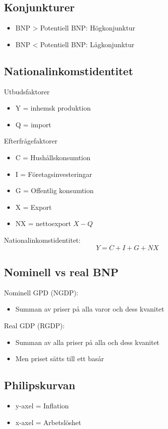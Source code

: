 \documentclass[12pt,a4paper]{article}
\begin{document}
\subsection*{Konjunkturer}
\begin{itemize}
    \item BNP > Potentiell BNP: Högkonjunktur
    \item BNP < Potentiell BNP: Lågkonjunktur
\end{itemize}

\subsection*{Nationalinkomstidentitet}
Utbudsfaktorer
\begin{itemize}
    \item Y = inhemsk produktion
    \item Q = import
\end{itemize}

\noindent Efterfrågefaktorer
\begin{itemize}
    \item C = Hushållskonsumtion
    \item I = Företagsinvesteringar
    \item G = Offentlig konsumtion
    \item X = Export
    \item NX = nettoexport $X-Q$
\end{itemize}

Nationalinkomstidentitet:
{\large $$Y = C + I + G + NX$$}

\subsection*{Nominell vs real BNP}
Nominell GPD (NGDP):
\begin{itemize}
    \item Summan av priser på alla varor och dess kvanitet
\end{itemize}

\noindent Real GDP (RGDP):
\begin{itemize}
    \item Summan av alla priser på alla och dess kvanitet
    \item Men priset sätts till ett basår
\end{itemize}

\subsection*{Philipskurvan}
\begin{itemize}
    \item y-axel = Inflation
    \item x-axel = Arbetslöshet
\end{itemize}
\end{document}
